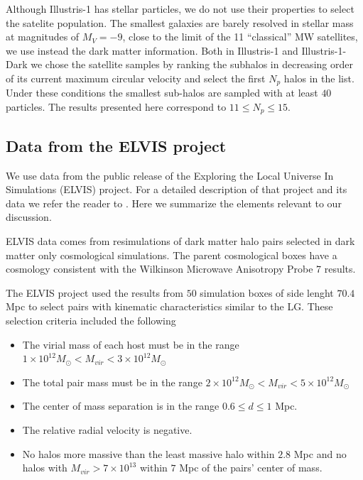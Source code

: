 \documentclass[a4paper,fleqn,usenatbib]{mnras}
\begin{document}
Although Illustris-1 has stellar particles, we do not use their
properties to select the satelite population.
The smallest galaxies are barely resolved in stellar mass at
magnitudes of $M_V=-9$, close to the limit of the 11 ``classical'' MW
satellites, we use instead the dark matter information. 
Both in Illustris-1 and Illustris-1-Dark we chose the satellite samples
by ranking the subhalos in decreasing order of its current maximum
circular velocity and select the first $N_p$ halos in the list.  
Under these conditions the smallest sub-halos are sampled with at least $40$ particles.  
The results presented here correspond to $11\leq N_p\leq 15$. 



\subsection{Data from the ELVIS project}
\label{sim:ELVIS}

We use data from the public release of the Exploring the Local
Universe In Simulations (ELVIS) project.
For a detailed description of that project and its data we refer the
reader to \cite{2014MNRAS.438.2578G}. 
Here we summarize the elements relevant to our discussion.

ELVIS data comes from resimulations of dark matter halo pairs selected
in dark matter only cosmological simulations. 
The parent cosmological boxes have a cosmology consistent with the
Wilkinson Microwave Anisotropy Probe 7 results.

The ELVIS project used the results from $50$ simulation boxes of side
lenght $70.4$ Mpc to select pairs with kinematic characteristics
similar to the LG. 
These selection criteria included the following
\begin{itemize}
\item The virial mass of each host must be in the range 
$1\times
  10^{12} M_{\odot}< M_{vir}<3\times 10^{12}M_{\odot}$ 
\item The total pair mass must be in the range
$2\times
  10^{12} M_{\odot}< M_{vir}<5\times 10^{12}M_{\odot}$ 
\item The center of mass separation is in the range $0.6\leq d\leq1$
  Mpc.
\item The relative radial velocity is negative.
\item No halos more massive than the least massive halo within $2.8$
  Mpc and no halos with $M_{vir}>7\times 10^{13}$ within $7$ Mpc of
  the pairs' center of mass.
\end{itemize} 
\end{document}
